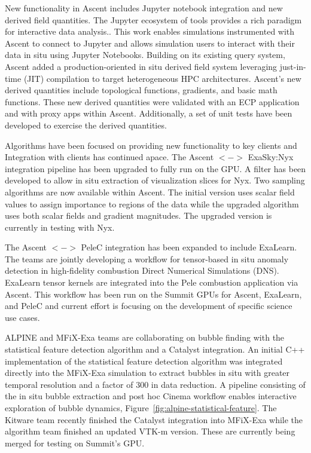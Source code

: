 New functionality in Ascent includes Jupyter notebook integration and new derived field quantities. The Jupyter ecosystem of tools provides a rich paradigm for interactive data analysis.. This work enables simulations instrumented with Ascent to connect to Jupyter and allows simulation users to interact with their data in situ using Jupyter Notebooks. 
Building on its existing query system, Ascent added a production-oriented in situ derived field system leveraging just-in-time (JIT) compilation to target heterogeneous HPC architectures.  Ascent's new derived quantities include topological functions, gradients, and basic math functions.  These new derived quantities were validated with an ECP application and with proxy apps within Ascent.  Additionally, a set of unit tests have been developed to exercise the derived quantities.   

Algorithms have been focused on providing new functionality to key clients and Integration with clients has continued apace.  The Ascent $<->$ ExaSky:Nyx integration pipeline has been upgraded to fully run on the GPU.  A filter has been developed to allow in situ extraction of visualization slices for Nyx.  Two sampling algorithms are now available within Ascent.  The initial version uses scalar field values to assign importance to regions of the data while the upgraded algorithm uses both scalar fields and gradient magnitudes.  The upgraded version is currently in testing with Nyx.  

The Ascent $<->$ PeleC integration has been expanded to include ExaLearn.  The teams are  jointly developing a workflow for tensor-based in situ anomaly detection in high-fidelity combustion Direct Numerical Simulations (DNS).  ExaLearn tensor kernels are integrated into the Pele combustion application via Ascent.  This workflow has been run on the Summit GPUs for Ascent, ExaLearn, and PeleC and current effort is focusing on the development of specific science use cases.

ALPINE and MFiX-Exa teams are collaborating on bubble finding with the statistical feature detection algorithm and a Catalyst integration.  An initial C++ implementation of the statistical feature detection algorithm was integrated directly into the MFiX-Exa simulation to extract bubbles in situ with greater temporal resolution and a factor of 300 in data reduction.  A pipeline consisting of the in situ bubble extraction and post hoc Cinema workflow enables interactive exploration of bubble dynamics, Figure~\ref{fig:alpine-statistical-feature}.  The Kitware team recently finished the Catalyst integration into MFiX-Exa while the algorithm team finished an updated VTK-m version.  These are currently being merged for testing on Summit's GPU.  

